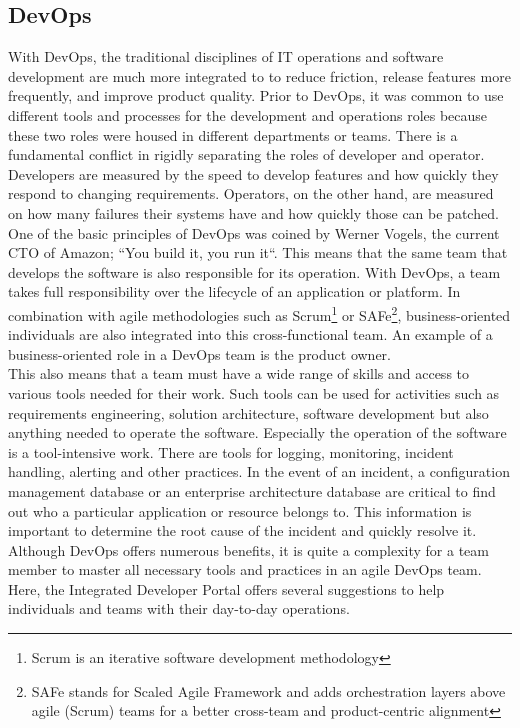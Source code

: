 \documentclass[a4paper,12pt]{article}
\begin{document}
    \subsection{DevOps}
    \label{subsec:devops}
    With DevOps, the traditional disciplines of IT operations and software development are much more integrated to
    to reduce friction, release features more frequently, and improve product quality\parencite{safedevops}.
    Prior to DevOps, it was common to use different tools and processes for the development and operations roles
    because these two roles were housed in different departments or teams.
    There is a fundamental conflict in rigidly separating the roles of developer and operator.
    Developers are measured by the speed to develop features and how quickly they respond to changing requirements.
    Operators, on the other hand, are measured on how many failures their systems have and how quickly those can be patched.\\
    One of the basic principles of DevOps was coined by Werner Vogels, the current CTO of Amazon;
    ``You build it, you run it``\parencite{vogels}.
    This means that the same team that develops the software is also responsible for its operation.
    With DevOps, a team takes full responsibility over the lifecycle of an application or platform.
    In combination with agile methodologies such as Scrum\footnote{Scrum is an iterative software development methodology}
    or SAFe\footnote{SAFe stands for Scaled Agile Framework and adds orchestration layers above agile (Scrum) teams for
    a better cross-team and product-centric alignment}, business-oriented individuals are also integrated into this
    cross-functional team.
    An example of a business-oriented role in a DevOps team is the product owner\parencite{safepo}.\\
    This also means that a team must have a wide range of skills and access to various tools needed for their work.
    Such tools can be used for activities such as requirements engineering, solution architecture, software development
    but also anything needed to operate the software.
    Especially the operation of the software is a tool-intensive work.
    There are tools for logging, monitoring, incident handling, alerting and other practices.
    In the event of an incident, a configuration management database or an enterprise architecture database are critical
    to find out who a particular application or resource belongs to.
    This information is important to determine the root cause of the incident and quickly resolve it.
    Although DevOps offers numerous benefits, it is quite a complexity for a team member to master all necessary tools and
    practices in an agile DevOps team.
    Here, the Integrated Developer Portal offers several suggestions to help individuals and teams with their day-to-day operations.
\end{document}
